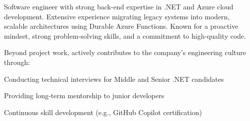 

\begin{cvparagraph}

Software engineer with strong back-end expertise in .NET and Azure cloud development. Extensive experience migrating legacy systems into modern, scalable architectures using Durable Azure Functions. Known for a proactive mindset, strong problem-solving skills, and a commitment to high-quality code.

\end{cvparagraph}

Beyond project work, actively contributes to the company's engineering culture through:
\begin{cvitems}
  \item {Conducting technical interviews for Middle and Senior .NET candidates}
  \item {Providing long-term mentorship to junior developers}
  \item {Continuous skill development (e.g., GitHub Copilot certification)}
\end{cvitems}
